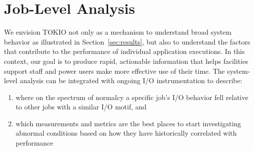\section{Job-Level Analysis} \label{sec:results/umami}

We envision TOKIO not only as a mechanism to understand broad system
behavior as illustrated in Section~\ref{sec:results}, but also to 
understand the factors that contribute to the performance of individual
application executions.  In this context, our goal is to produce rapid,
actionable information that helps facilities support staff and power
users make more effective use of their time.
The system-level analysis can be integrated with ongoing I/O instrumentation
to describe:

\begin{enumerate}
\item where on the spectrum of normalcy a specific job's I/O behavior fell relative to other jobs with a similar I/O motif, and
\item which measurements and metrics are the best places to start investigating abnormal conditions based on how they have historically correlated with performance
\end{enumerate}

